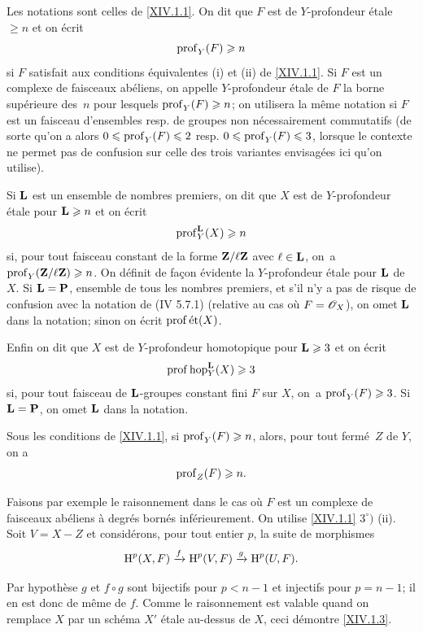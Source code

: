 \begin{definition} \label{XIV.1.2}
Les notations sont celles de \ref{XIV.1.1}. On dit que $F$ est de $Y$-profondeur \'etale $\geq n$ et on \'ecrit
$$
\operatorname{prof}_Y(F)\geqslant n$$
si $F$ satisfait aux conditions \'equivalentes \textup{(i)} et \textup{(ii)} de \ref{XIV.1.1}. Si $F$ est un complexe de faisceaux ab\'eliens, on appelle $Y$-profondeur \'etale de $F$ la borne sup\'erieure des~$n$ pour lesquels $\operatorname{prof}_Y(F)\geqslant n$; on utilisera la m\^eme notation si $F$ est un faisceau d'ensembles resp. de groupes non n\'ecessairement commutatifs (de sorte qu'on a alors $0\leqslant \operatorname{prof}_Y(F)\leqslant 2$ resp. $0\leqslant \operatorname{prof}_Y(F)\leqslant 3$, lorsque le contexte ne permet pas de confusion sur celle des trois variantes envisag\'ees ici qu'on utilise).

Si $\mathbf{L}$ est un ensemble de nombres premiers, on dit que $X$ est de $Y$-profondeur \'etale pour $\mathbf{L} \geqslant n$ et on \'ecrit
$$
\operatorname{prof}_Y^{\mathbf{L}}(X)\geqslant n
$$
si, pour tout faisceau constant de la forme $\mathbf{Z}/\ell\mathbf{Z}$ avec $\ell\in \mathbf{L}$, on~a $\operatorname{prof}_Y(\mathbf{Z}/\ell\mathbf{Z})\geqslant n$. On d\'efinit de fa\c con \'evidente la $Y$-profondeur \'etale pour $\mathbf{L}$ de $X$. Si $\mathbf{L}={\mathbf P}$, ensemble de tous les nombres premiers, et s'il n'y a pas de risque de confusion avec la notation de \textup{(\EGA IV 5.7.1)} (relative au cas o\`u $F=\mathscr{O}_X$), on omet $\mathbf{L}$ dans la notation; sinon on \'ecrit $\operatorname{prof} {\textup{ét}}(X)$.

Enfin on dit que $X$ est de $Y$-profondeur homotopique \ignorespaces pour $\mathbf{L} \geqslant 3$ et on \'ecrit
$$
\operatorname{prof} \operatorname{hop}_Y^{\mathbf{L}}(X)\geqslant 3$$
si, pour tout faisceau de $\mathbf{L}$-groupes constant fini $F$ sur $X$, on~a $\operatorname{prof}_Y(F)\geqslant 3$. Si $\mathbf{L}={\mathbf P}$, on omet $\mathbf{L}$ dans la notation.
\end{definition}

\begin{corollaire} \label{XIV.1.3}
Sous les conditions de \ref{XIV.1.1}, si $\operatorname{prof}_Y(F)\geqslant n$, alors, pour tout ferm\'e~$Z$ de $Y$, on a
$$
\operatorname{prof}_Z(F)\geqslant n.
$$
\end{corollaire}

Faisons par exemple le raisonnement dans le cas o\`u $F$ est un complexe de faisceaux ab\'eliens \`a degr\'es born\'es inf\'erieurement. On utilise \ref{XIV.1.1} $3^\circ)$ \textup{(ii)}. Soit $V=X-Z$ et consid\'erons, pour tout entier $p$, la suite de morphismes
$$
\operatorname{H}^p(X, F)\xrightarrow{f} \operatorname{H}^p(V, F)\xrightarrow{g} \operatorname{H}^p(U, F).
$$

Par hypoth\`ese $g$ et $f\circ g$ sont bijectifs pour $p<n-1$ et injectifs pour $p=n-1$; il en est donc de m\^eme de $f$. Comme le raisonnement est valable quand on remplace $X$ par un sch\'ema $X'$ \'etale au-dessus de $X$, ceci d\'emontre \ref{XIV.1.3}.

